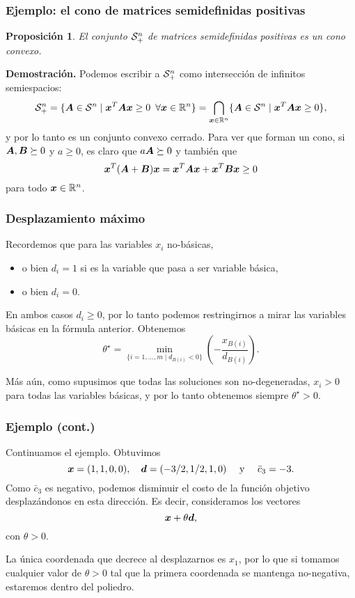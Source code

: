 \documentclass[aspectratio=169,12pt,spanish]{beamer}
\newtheorem{proposition}[theorem]{Proposición}
\begin{document}
\begin{frame}
\frametitle{Ejemplo: el cono de matrices semidefinidas positivas}

\begin{proposition}
El conjunto ${\mathcal S_+^n}$ de matrices semidefinidas positivas es un cono convexo.
\end{proposition}

\textbf{Demostración.}
Podemos escribir a ${\mathcal S_+^n}$ como intersección de infinitos semiespacios:
$$
{\mathcal S_+^n} = \{\bm{A} \in {\mathcal S^n} \mid \bm{x}^T \bm{A} \bm{x} \ge 0 \enspace \forall \bm{x} \in \mathbb{R}^n\} = \bigcap_{\bm{x}\in\mathbb{R}^n} \{\bm{A} \in {\mathcal S^n} \mid \bm{x}^T \bm{A} \bm{x} \ge 0\},
$$
y por lo tanto es un conjunto convexo cerrado.
Para ver que forman un cono, si $\bm{A}, \bm{B} \succeq 0$ y $a \ge 0$, es claro que $a \bm{A} \succeq 0$ y también que
$$\bm{x}^T (\bm{A} + \bm{B}) \bm{x} = \bm{x}^T \bm{A} \bm{x} + \bm{x}^T \bm{B} \bm{x} \ge 0$$
 para todo $\bm{x} \in \mathbb{R}^n$.

\end{frame}


\begin{frame}
\frametitle{Desplazamiento máximo}


Recordemos que para las variables $x_i$ no-básicas,
\begin{itemize}
\item o bien $d_i = 1$ si es la variable que pasa a ser variable básica,
\item o bien $d_i = 0$.
\end{itemize}

En ambos casos $d_i \ge 0$, por lo tanto podemos restringirnos a mirar las variables básicas en la fórmula anterior. Obtenemos
\begin{equation}
\label{eq:thetastar}
\theta^\star = \min_{\{i = 1, \dots, m \mid d_{B(i)} < 0 \}}\left(-\frac{x_{B(i)}}{d_{B(i)}}\right).
\end{equation}

Más aún, como supusimos que todas las soluciones son no-degeneradas, $x_i > 0$ para todas las variables básicas, y por lo tanto obtenemos siempre $\theta^\star > 0$.

\end{frame}


\begin{frame}
\frametitle{Ejemplo (cont.)}

Continuamos el ejemplo. Obtuvimos
$$\bm{x} = (1, 1, 0, 0), \quad \bm{d} = (-3/2, 1/2, 1, 0)\quad \text{ y } \quad \bar c_3 = -3.$$
Como $\bar c_3$ es negativo, podemos disminuir el costo de la función objetivo desplazándonos en esta dirección. Es decir, consideramos los vectores
$$
\bm{x} + \theta \bm{d},
$$
con $\theta > 0$.

La única coordenada que decrece al desplazarnos es $x_1$, por lo que si tomamos cualquier valor de $\theta > 0$ tal que la primera coordenada se mantenga no-negativa, estaremos dentro del poliedro.

\end{frame}
\end{document}
